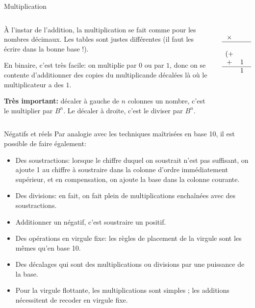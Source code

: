 \begin{frame}{Multiplication}
  \begin{columns}[c]
    \begin{column}{0.65\linewidth}
      \begin{methode}[Multiplication]
        À l'instar de l'addition, la multiplication se fait comme pour les
        nombres décimaux. Les tables sont justes différentes (il faut les
        écrire dans la bonne base !).

        En binaire, c'est très facile: on multiplie par $0$ ou par $1$, donc
        on se contente d'additionner des copies du multiplicande décalées là
        où le multiplicateur a des $1$.

        \textbf{Très important:} décaler à gauche de $n$ colonnes un nombre,
        c'est le multiplier par $B^n$. Le décaler à droite, c'est le diviser
        par $B^n$.
      \end{methode}
    \end{column}
    \begin{column}{0.35\linewidth}
      $$\begin{array}{cccccc}
        &&&1&1&0\\
        \times&&&1&0&1\\\hline
        &&&1&1&0\\
        (+&&&&0&)\\
        +&1&1&0&&\\\hline
        &1&1&1&1&0
      \end{array}
      $$
    \end{column}
  \end{columns}
\end{frame}
\begin{frame}{Négatifs et réels}
  Par analogie avec les techniques maîtrisées en base 10, il est
  possible de faire également:
  \begin{itemize}
  \item Des soustractions: lorsque le chiffre duquel on soustrait n'est
    pas suffisant, on ajoute 1 au chiffre à soustraire dans la colonne
    d'ordre immédiatement supérieur, et en compensation, on ajoute la
    base dans la colonne courante.
  \item Des divisions: en fait, on fait plein de multiplications
    enchaînées avec des soustractions.
  \item Additionner un négatif, c'est soustraire un positif.
  \item Des opérations en virgule fixe: les règles de placement de la
    virgule sont les mêmes qu'en base 10.
  \item Des décalages qui sont des multiplications ou divisions par une
    puissance de la base.
  \item Pour la virgule flottante, les multiplications sont simples ;
    les additions nécessitent de recoder en virgule fixe.
  \end{itemize}
\end{frame}
